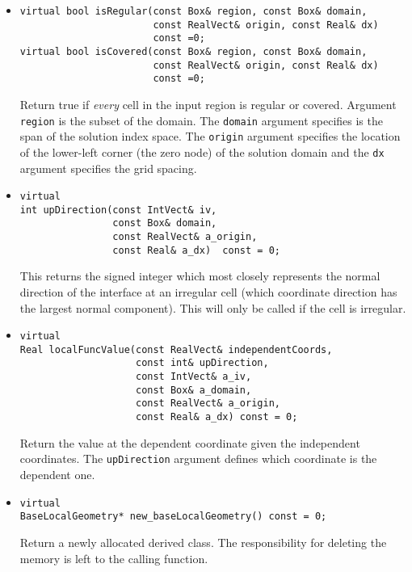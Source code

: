 \begin{itemize}
\item
\begin{small}\begin{verbatim}
virtual bool isRegular(const Box& region, const Box& domain,
                       const RealVect& origin, const Real& dx)
                       const =0;
virtual bool isCovered(const Box& region, const Box& domain,
                       const RealVect& origin, const Real& dx)
                       const =0;
\end{verbatim}\end{small}
Return true if {\em every} cell in the input region
is regular or covered.  
Argument {\tt region} is the subset of the domain.
The {\tt domain} argument specifies is the span of the solution
index space.  The {\tt origin} argument specifies the location of the
lower-left corner (the zero node)
of the solution domain and the {\tt dx} argument 
specifies the grid spacing.

\item \begin{small}\begin{verbatim}
virtual
int upDirection(const IntVect& iv, 
                const Box& domain,
                const RealVect& a_origin, 
                const Real& a_dx)  const = 0; 
\end{verbatim}\end{small}
This returns the signed integer which most closely 
represents the normal direction
of the interface at an irregular cell (which coordinate
direction has the largest normal component).  
This will only be called if the cell is irregular.

\item \begin{small}\begin{verbatim}
virtual
Real localFuncValue(const RealVect& independentCoords,
                    const int& upDirection,
                    const IntVect& a_iv, 
                    const Box& a_domain, 
                    const RealVect& a_origin, 
                    const Real& a_dx) const = 0;  
\end{verbatim}\end{small}
Return the value at the dependent coordinate given the independent
coordinates.  The {\tt upDirection} argument defines which
coordinate is the dependent one.

\item \begin{small}\begin{verbatim}
virtual
BaseLocalGeometry* new_baseLocalGeometry() const = 0;       
\end{verbatim}\end{small}
Return a newly allocated derived class.  The responsibility
for deleting the memory is left to the calling function.
\end{itemize}

